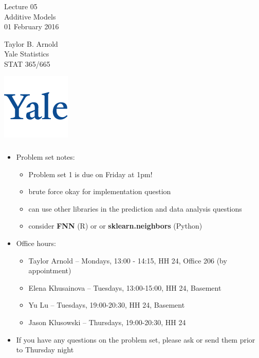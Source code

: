 \documentclass[xetex,mathserif,serif,aspectratio=169]{beamer}
\begin{document}
\begin{frame}[fragile] \frametitle{} \oldB \small

\vfill

{\fontsize{0.7cm}{0cm}\selectfont Lecture 05 \\\vspace{0.2cm} Additive Models}\\\vspace{0.5cm}
01 February 2016

\vspace{2cm}

\begin{minipage}{0.6\textwidth}
Taylor B. Arnold \\
Yale Statistics \\
STAT 365/665
\end{minipage}
\hfill
\begin{minipage}{0.3\textwidth}\raggedleft
\includegraphics[scale=0.3]{../yale-logo.png}
\end{minipage}%

\end{frame}

\begin{frame}[fragile] \frametitle{} \oldB \small

\begin{itemize}
\item Problem set notes:
\begin{itemize}
\item Problem set 1 is due on Friday at 1pm!
\item brute force okay for implementation question
\item can use other libraries in the prediction and data analysis questions
\item consider \textbf{FNN} (R) or or \textbf{sklearn.neighbors} (Python)
\end{itemize}
\item Office hours:
\begin{itemize}
\item Taylor Arnold -- Mondays, 13:00 - 14:15, HH 24, Office 206 (by appointment)
\item Elena Khusainova -- Tuesdays, 13:00-15:00, HH 24, Basement
\item Yu Lu -- Tuesdays, 19:00-20:30, HH 24, Basement
\item Jason Klusowski -- Thursdays, 19:00-20:30, HH 24
\end{itemize}
\item If you have any questions on the problem set, please ask or send
them prior to Thursday night
\end{itemize}

\end{frame}
\end{document}

